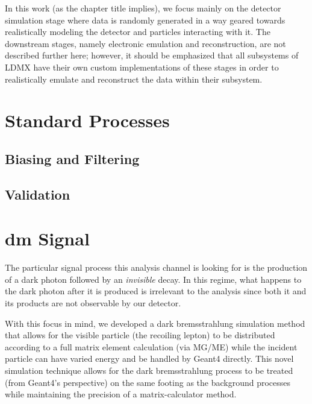 In this work (as the chapter title implies), we focus mainly on the detector simulation stage where data is randomly generated in a way geared towards realistically modeling the detector and particles interacting with it. The downstream stages, namely electronic emulation and reconstruction, are not described further here; however, it should be emphasized that all subsystems of LDMX have their own custom implementations of these stages in order to realistically emulate and reconstruct the data within their subsystem.

\section{Standard Processes}

\subsection{Biasing and Filtering}

\subsection{Validation}

\section{\gls{dm} Signal}
The particular signal process this analysis channel is looking for is the
production of a dark photon followed by an \emph{invisible} decay. In this
regime, what happens to the dark photon after it is produced is irrelevant
to the analysis since both it and its products are not observable by our
detector.

With this focus in mind, we developed a dark bremsstrahlung simulation method
that allows for the visible particle (the recoiling lepton) to be distributed
according to a full matrix element calculation (via MG/ME) while the incident
particle can have varied energy and be handled by Geant4 directly. This novel
simulation technique allows for the dark bremsstrahlung process to be treated
(from Geant4's perspective) on the same footing as the background processes
while maintaining the precision of a matrix-calculator method.

